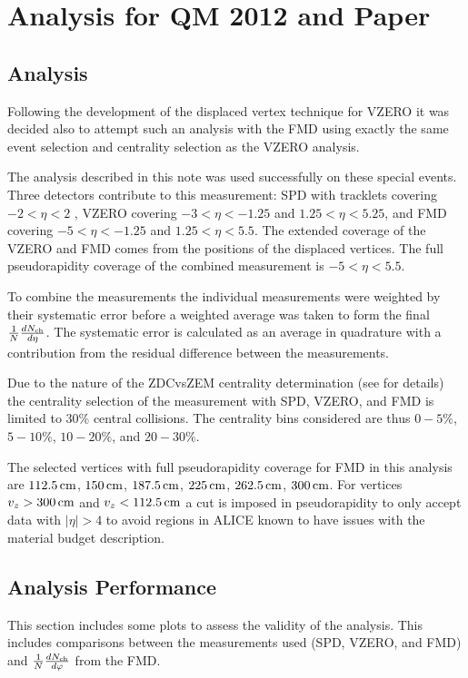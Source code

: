 \documentclass[11pt]{article}
\def\AlwaysText#1{\ifmmode\relax\text{#1}\else #1\fi}
\newcommand{\mult}[1][]{\ensuremath N_{\text{ch}#1}}
\newcommand{\dndeta}[1][]{{\ensuremath%
    \ifx|#1|\else\left.\fi%
    \frac{1}{N}\frac{d\mult{}}{d\eta}%
    \ifx|#1|\else\right|_{#1}\fi%
}}
\newcommand{\dndphi}[1][]{{\ensuremath%
    \ifx|#1|\else\left.\fi%
    \frac{1}{N}\frac{d\mult{}}{d\varphi}%
    \ifx|#1|\else\right|_{#1}\fi%
}}
\newcommand{\cm}[1]{\unit[#1]{\AlwaysText{cm}}}
\begin{document}
\section{Analysis for QM 2012 and Paper} \label{prelim}
\subsection{Analysis}
Following the development of the displaced vertex technique for VZERO \cite{maxime} it was
decided also to attempt such an analysis with the FMD using exactly
the same event selection and centrality selection as the VZERO
analysis.

The analysis described in this note was used successfully
on these special events. Three detectors contribute to this
measurement: SPD with tracklets covering $-2<\eta<2$ \cite{ruben,Aamodt:2010cz}, VZERO covering
$-3<\eta<-1.25$ and $1.25<\eta<5.25$, and FMD covering $-5<\eta<-1.25$
and $1.25<\eta<5.5$. The extended coverage of the VZERO and FMD comes
from the positions of the displaced vertices. The full pseudorapidity
coverage of the combined measurement is $-5<\eta<5.5$. 

To combine the measurements the individual measurements were weighted by
their systematic error before a weighted average was taken to form the
final $\dndeta$. The systematic error is calculated as an average in
quadrature with a contribution from the residual difference between
the measurements. 

Due to the nature of the ZDCvsZEM centrality determination (see
\cite{maxime} for details) the centrality selection of the measurement
with SPD, VZERO, and FMD is limited to $30\%$ central collisions. The
centrality bins considered are thus $0-5\%$, $5-10\%$, $10-20\%$, and
$20-30\%$. 

The selected vertices with full pseudorapidity coverage for FMD in
this analysis are $\cm{112.5}$, $\cm{150}$, $\cm{187.5}$, $\cm{225}$,
$\cm{262.5}$, $\cm{300}$. For vertices $v_z > \cm{300}$ and $v_z <
\cm{112.5}$ a cut is imposed in pseudorapidity to only accept data
with $|\eta| > 4$ to avoid regions in ALICE known to have issues with
the material budget description.

\subsection{Analysis Performance}
This section includes some plots to assess the validity of the
analysis. This includes comparisons between the measurements used
(SPD, VZERO, and FMD) and
$\dndphi$ from the FMD. 
\end{document}
